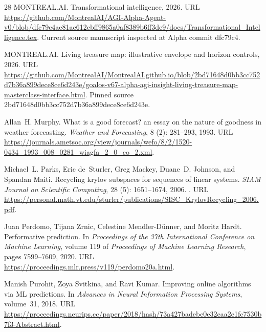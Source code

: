 \documentclass[11pt,a4paper]{article}
\begin{document}
\begin{thebibliography}{28}
{MONTREAL.AI}.
\newblock Transformational intelligence, 2026{}.
\newblock URL
  \url{https://github.com/MontrealAI/AGI-Alpha-Agent-v0/blob/dfc79c4ae81ac612cbff9865a0af8389b6ff3de9/docs/Transformational_Intelligence.tex}.
\newblock Current source manuscript inspected at Alpha commit dfc79c4.

{MONTREAL.AI}.
\newblock Living treasure map: illustrative envelope and horizon controls,
  2026{}.
\newblock URL
  \url{https://github.com/MontrealAI/MontrealAI.github.io/blob/2bd71648d0bb3cc752d7b36a899dece8ce6d243e/goalos-v67-alpha-agi-insight-living-treasure-map-masterclass-interface.html}.
\newblock Pinned source 2bd71648d0bb3cc752d7b36a899dece8ce6d243e.

Allan~H. Murphy.
\newblock What is a good forecast? an essay on the nature of goodness in
  weather forecasting.
\newblock \emph{Weather and Forecasting}, 8 (2): 281--293,
  1993.
\newblock URL
  \url{https://journals.ametsoc.org/view/journals/wefo/8/2/1520-0434_1993_008_0281_wiagfa_2_0_co_2.xml}.

Michael~L. Parks, Eric de~Sturler, Greg Mackey, Duane~D. Johnson, and Spandan
  Maiti.
\newblock Recycling krylov subspaces for sequences of linear systems.
\newblock \emph{SIAM Journal on Scientific Computing}, 28
  (5): 1651--1674, 2006.
\newblock {}.
\newblock URL
  \url{https://personal.math.vt.edu/sturler/publications/SISC_KrylovRecycling_2006.pdf}.

Juan Perdomo, Tijana Zrnic, Celestine Mendler-D{\"u}nner, and Moritz Hardt.
\newblock Performative prediction.
\newblock In \emph{Proceedings of the 37th International Conference on Machine
  Learning}, volume 119 of \emph{Proceedings of Machine Learning Research},
  pages 7599--7609, 2020.
\newblock URL \url{https://proceedings.mlr.press/v119/perdomo20a.html}.

Manish Purohit, Zoya Svitkina, and Ravi Kumar.
\newblock Improving online algorithms via {ML} predictions.
\newblock In \emph{Advances in Neural Information Processing Systems},
  volume~31, 2018.
\newblock URL
  \url{https://proceedings.neurips.cc/paper/2018/hash/73a427badebe0e32caa2e1fc7530b7f3-Abstract.html}.


\end{thebibliography}
\end{document}
